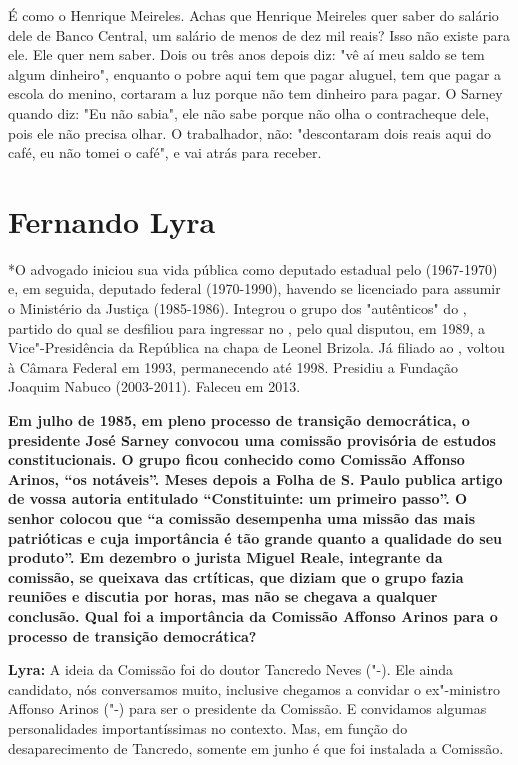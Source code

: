 É como o Henrique Meireles. Achas que Henrique Meireles quer saber do
salário dele de Banco Central, um salário de menos de dez mil reais?
Isso não existe para ele. Ele quer nem saber. Dois ou três anos depois
diz: "vê aí meu saldo se tem algum dinheiro", enquanto o pobre aqui tem
que pagar aluguel, tem que pagar a escola do menino, cortaram a luz
porque não tem dinheiro para pagar. O Sarney quando diz: "Eu não sabia",
ele não sabe porque não olha o contracheque dele, pois ele não precisa
olhar. O trabalhador, não: "descontaram dois reais aqui do café, eu não
tomei o café", e vai atrás para receber.

\chapter{Fernando Lyra}

*O advogado iniciou sua vida pública como deputado estadual pelo 
(1967-1970) e, em seguida, deputado federal (1970-1990), havendo se
licenciado para assumir o Ministério da Justiça (1985-1986). Integrou o
grupo dos "autênticos" do , partido do qual se desfiliou para
ingressar no , pelo qual disputou, em 1989, a Vice"-Presidência da
República na chapa de Leonel Brizola. Já filiado ao , voltou à Câmara
Federal em 1993, permanecendo até 1998. Presidiu a Fundação Joaquim
Nabuco (2003-2011). Faleceu em 2013.

\textbf{Em julho de 1985, em pleno processo de transição democrática, o
presidente José Sarney convocou uma comissão provisória de estudos
constitucionais. O grupo ficou conhecido como Comissão Affonso Arinos,
``os notáveis''. Meses depois a Folha de S. Paulo publica artigo de
vossa autoria entitulado ``Constituinte: um primeiro passo''. O senhor
colocou que ``a comissão desempenha uma missão das mais patrióticas e
cuja importância é tão grande quanto a qualidade do seu produto''. Em
dezembro o jurista Miguel Reale, integrante da comissão, se queixava das
crtíticas, que diziam que o grupo fazia reuniões e discutia por horas,
mas não se chegava a qualquer conclusão. Qual foi a importância da
Comissão Affonso Arinos para o processo de transição democrática?}

\textbf{Lyra:} A ideia da Comissão foi do doutor Tancredo Neves
("-). Ele ainda candidato, nós conversamos muito, inclusive
chegamos a convidar o ex"-ministro Affonso Arinos ("-) para ser o
presidente da Comissão. E convidamos algumas personalidades
importantíssimas no contexto. Mas, em função do desaparecimento de
Tancredo, somente em junho é que foi instalada a Comissão.

